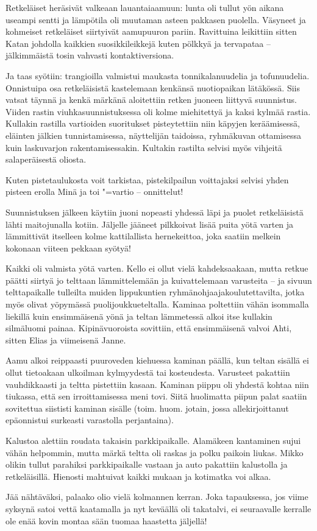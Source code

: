 \begin{multicols}{2}
	Retkeläiset heräsivät valkeaan lauantaiaamuun: lunta oli tullut yön
	aikana useampi sentti ja lämpötila oli muutaman asteen pakkasen
	puolella. Väsyneet ja kohmeiset retkeläiset siirtyivät aamupuuron
	pariin. Ravittuina leikittiin sitten Katan johdolla kaikkien
	suosikkileikkejä kuten pölkkyä ja tervapataa -- jälkimmäistä tosin
	vahvasti kontaktiversiona. 

	Ja taas syötiin: trangioilla valmistui maukasta tonnikalanuudelia ja
	tofunuudelia. Onnistuipa osa retkeläisistä kastelemaan kenkänsä
	nuotiopaikan lätäkössä. Siis vatsat täynnä ja kenkä märkänä aloitettiin
	retken juoneen liittyvä suunnistus. Viiden rastin viuhkasuunnistuksessa
	oli kolme miehitettyä ja kaksi kylmää rastia. Kullakin rastilla
	vartioiden suoritukset pisteytettiin niin käpyjen keräämisessä,
	eläinten jälkien tunnistamisessa, näyttelijän taidoissa, ryhmäkuvan
	ottamisessa kuin laskuvarjon rakentamisessakin. Kultakin rastilta
	selvisi myös vihjeitä salaperäisestä oliosta. 

	Kuten pistetaulukosta voit tarkistaa, pistekilpailun voittajaksi
	selvisi yhden pisteen erolla Minä ja toi "=vartio -- onnittelut!

	Suunnistuksen jälkeen käytiin juoni nopeasti yhdessä läpi ja puolet
	retkeläisistä lähti maitojunalla kotiin. Jäljelle jääneet pilkkoivat
	lisää puita yötä varten ja lämmittivät itselleen kolme kattilallista
	hernekeittoa, joka saatiin melkein kokonaan viiteen pekkaan syötyä!

	Kaikki oli valmista yötä varten. Kello ei ollut vielä kahdeksaakaan,
	mutta retkue päätti siirtyä jo telttaan lämmittelemään ja
	kuivattelemaan varusteita -- ja sivuun telttapaikalle tulleilta muiden
	lippukuntien ryhmänohjaajakoulutettavilta, jotka myös olivat yöpymässä
	puolijoukkueteltalla. Kaminaa poltettiin vähän isommalla liekillä kuin
	ensimmäisenä yönä ja teltan lämmetessä alkoi itse kullakin silmäluomi
	painaa. Kipinävuoroista sovittiin, että ensimmäisenä valvoi Ahti,
	sitten Elias ja viimeisenä Janne. 

	Aamu alkoi reippaasti puuroveden kiehuessa kaminan päällä, kun teltan
	sisällä ei ollut tietoakaan ulkoilman kylmyydestä tai kosteudesta.
	Varusteet pakattiin vauhdikkaasti ja teltta pistettiin kasaan. Kaminan
	piippu oli yhdestä kohtaa niin tiukassa, että sen irroittamisessa meni
	tovi. Siitä huolimatta piipun palat saatiin sovitettua siististi
	kaminan sisälle (toim. huom. jotain, jossa allekirjoittanut epäonnistui
	surkeasti varastolla perjantaina).

	Kalustoa alettiin roudata takaisin parkkipaikalle. Alamäkeen kantaminen
	sujui vähän helpommin, mutta märkä teltta oli raskas ja polku paikoin
	liukas. Mikko olikin tullut parahiksi parkkipaikalle vastaan ja auto
	pakattiin kalustolla ja retkeläisillä. Hienosti mahtuivat kaikki mukaan
	ja kotimatka voi alkaa.

	Jää nähtäväksi, palaako olio vielä kolmannen kerran. Joka tapauksessa,
	jos viime syksynä satoi vettä kaatamalla ja nyt keväällä oli takatalvi,
	ei seuraavalle kerralle ole enää kovin montaa sään tuomaa haastetta
	jäljellä!

\end{multicols}


